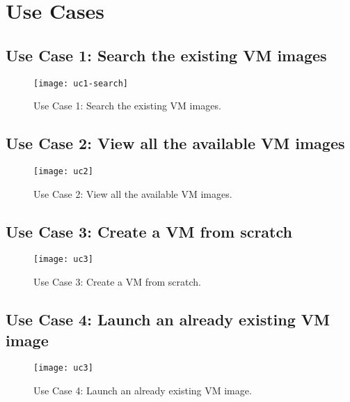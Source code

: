\chapter{Use Cases} \label{chap:ap4}

\section{Use Case 1: Search the existing VM images}
\begin{figure}[h!]
  \begin{center}
    \leavevmode 
    \texttt{[image: uc1-search]}
    \caption{Use Case 1: Search the existing VM images.}
    \label{fig:uc1-search}
  \end{center}
\end{figure}

\clearpage
\section{Use Case 2: View all the available VM images}
\begin{figure}[h!]
  \begin{center}
    \leavevmode 
    \texttt{[image: uc2]}
    \caption{Use Case 2: View all the available VM images.}
    \label{fig:uc2}
  \end{center}
\end{figure}

\clearpage
\section{Use Case 3: Create a VM from scratch}
\begin{figure}[h!]
  \begin{center}
    \leavevmode 
    \texttt{[image: uc3]}
    \caption{Use Case 3: Create a VM from scratch.}
    \label{fig:uc3}
  \end{center}
\end{figure}

\clearpage
\section{Use Case 4: Launch an already existing VM image}
\begin{figure}[h!]
  \begin{center}
    \leavevmode 
    \texttt{[image: uc3]}
    \caption{Use Case 4: Launch an already existing VM image.}
    \label{fig:uc4}
  \end{center}
\end{figure}
